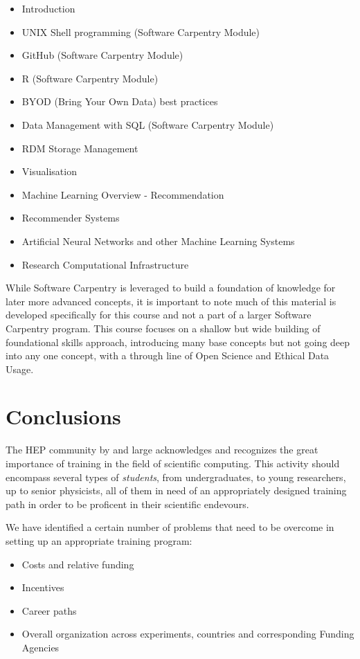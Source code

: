 \documentclass[12pt,a4paper]{article}
\begin{document}
\begin{itemize}
\item Introduction
\item UNIX Shell programming (Software Carpentry Module)
\item GitHub (Software Carpentry Module)
\item R (Software Carpentry Module)
\item BYOD (Bring Your Own Data) best practices
\item Data Management with SQL  (Software Carpentry Module)
\item RDM Storage Management
\item Visualisation
\item Machine Learning Overview - Recommendation
\item Recommender Systems
\item Artificial Neural Networks and other Machine Learning Systems 
\item Research Computational Infrastructure 
\end{itemize}

While Software Carpentry is leveraged to build a foundation of knowledge for
later more advanced concepts, it is important to note much of this material is
developed specifically for this course and not a part of a larger Software
Carpentry program. This course focuses on a shallow but wide building of
foundational skills approach, introducing many base concepts but not going deep
into any one concept, with a through line of Open Science and Ethical Data
Usage.

\section{Conclusions}

The HEP community by and large acknowledges and recognizes the great importance
of training in the field of scientific computing. This activity should encompass
several types of {\it students}, from undergraduates, to young researchers, up
to senior physicists, all of them in need of an appropriately designed training
path in order to be proficent in their scientific endevours.

We have identified a certain number of problems that need to be overcome in
setting up an appropriate training program:
\begin{itemize}
    \item Costs and relative funding
    \item Incentives
    \item Career paths
    \item Overall organization across experiments, countries and 
    corresponding Funding Agencies
\end{itemize}
\end{document}
